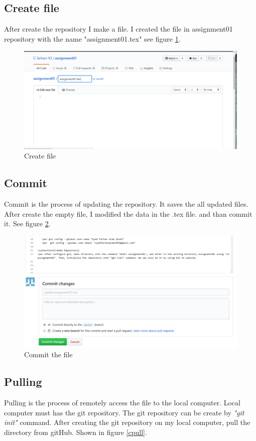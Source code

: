 \documentclass[paper=a4, fontsize=12pt]{scrartcl}
\numberwithin{equation}{section} %
\numberwithin{figure}{section} %
\numberwithin{table}{section} %
\begin{document}
\subsection{Create file}
After create the repository I make a file. I created the file in assignment01 repository with the name "assignment01.tex" see figure \ref{cfile}.

\begin{figure}
\includegraphics[width=\linewidth]{createfile.PNG}
\caption{Create file}
\label{cfile}
\end{figure}

\subsection{Commit}
Commit is the process of updating the repository. It saves the all updated files. After create the empty file, I modified the data in the .tex file. and than commit it. See figure \ref{ccom}.

\begin{figure}
\includegraphics[width=\linewidth]{Commit.PNG}
\caption{Commit the file}
\label{ccom}
\end{figure}


\subsection{Pulling}
Pulling is the process of remotely access the file to the local computer. Local computer must has the git repository. 
The git repository can be create by \textit{"git init"} command. After creating the git repository on my local computer, pull the directory from gitHub. Shown in figure \ref{cpull}.
\end{document}
